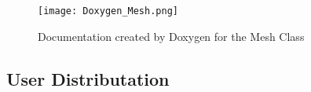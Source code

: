 \begin{figure}
\texttt{[image: Doxygen\_Mesh.png]}
\centering
  \caption{Documentation created by Doxygen for the Mesh Class}
  \label{fig:Doxygen_Mesh}
\end{figure}


\subsection{User Distributation}
% 
